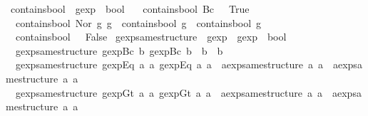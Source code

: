 \begin{isabellebody}
\isanewline
{}\isamarkupfalse%
\ contains{\isacharunderscore}bool\ {\isacharcolon}{\isacharcolon}\ {\isachardoublequoteopen}gexp\ {\isasymRightarrow}\ bool{\isachardoublequoteclose}\ \isanewline
\ \ {\isachardoublequoteopen}contains{\isacharunderscore}bool\ {\isacharparenleft}Bc\ {\isacharunderscore}{\isacharparenright}\ {\isacharequal}\ True{\isachardoublequoteclose}\ {\isacharbar}\isanewline
\ \ {\isachardoublequoteopen}contains{\isacharunderscore}bool\ {\isacharparenleft}Nor\ g{}\ g{}{\isacharparenright}\ {\isacharequal}\ {\isacharparenleft}contains{\isacharunderscore}bool\ g{}\ {\isasymor}\ contains{\isacharunderscore}bool\ g{}{\isacharparenright}{\isachardoublequoteclose}\ {\isacharbar}\isanewline
\ \ {\isachardoublequoteopen}contains{\isacharunderscore}bool\ {\isacharunderscore}\ {\isacharequal}\ False{\isachardoublequoteclose}\isanewline
\isanewline
{}\isamarkupfalse%
\ gexp{\isacharunderscore}same{\isacharunderscore}structure\ {\isacharcolon}{\isacharcolon}\ {\isachardoublequoteopen}gexp\ {\isasymRightarrow}\ gexp\ {\isasymRightarrow}\ bool{\isachardoublequoteclose}\ \isanewline
\ \ {\isachardoublequoteopen}gexp{\isacharunderscore}same{\isacharunderscore}structure\ {\isacharparenleft}gexp{\isachardot}Bc\ b{\isacharparenright}\ {\isacharparenleft}gexp{\isachardot}Bc\ b{\isacharprime}{\isacharparenright}\ {\isacharequal}\ {\isacharparenleft}b\ {\isacharequal}\ b{\isacharprime}{\isacharparenright}{\isachardoublequoteclose}\ {\isacharbar}\isanewline
\ \ {\isachardoublequoteopen}gexp{\isacharunderscore}same{\isacharunderscore}structure\ {\isacharparenleft}gexp{\isachardot}Eq\ a{}\ a{}{\isacharparenright}\ {\isacharparenleft}gexp{\isachardot}Eq\ a{}{\isacharprime}\ a{}{\isacharprime}{\isacharparenright}\ {\isacharequal}\ {\isacharparenleft}aexp{\isacharunderscore}same{\isacharunderscore}structure\ a{}\ a{}{\isacharprime}\ {\isasymand}\ aexp{\isacharunderscore}same{\isacharunderscore}structure\ a{}\ a{}{\isacharprime}{\isacharparenright}{\isachardoublequoteclose}\ {\isacharbar}\isanewline
\ \ {\isachardoublequoteopen}gexp{\isacharunderscore}same{\isacharunderscore}structure\ {\isacharparenleft}gexp{\isachardot}Gt\ a{}\ a{}{\isacharparenright}\ {\isacharparenleft}gexp{\isachardot}Gt\ a{}{\isacharprime}\ a{}{\isacharprime}{\isacharparenright}\ {\isacharequal}\ {\isacharparenleft}aexp{\isacharunderscore}same{\isacharunderscore}structure\ a{}\ a{}{\isacharprime}\ {\isasymand}\ aexp{\isacharunderscore}same{\isacharunderscore}structure\ a{}\ a{}{\isacharprime}{\isacharparenright}{\isachardoublequoteclose}\ {\isacharbar}\isanewline

\end{isabellebody}
